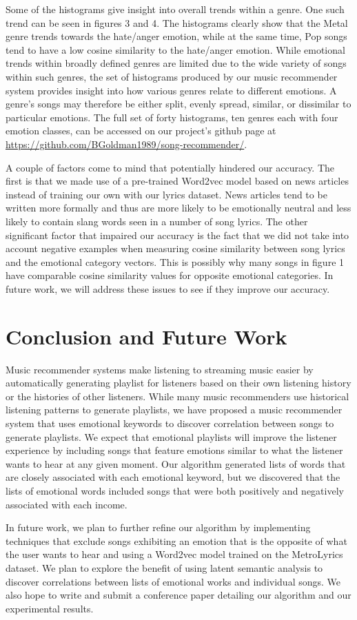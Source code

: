 \documentclass[10pt,twocolumn]{article}
\begin{document}
Some of the histograms give insight into overall trends within a genre. One such trend can be seen in figures 3 and 4. The histograms clearly show that the Metal genre trends towards the hate/anger emotion, while at the same time, Pop songs tend to have a low cosine similarity to the hate/anger emotion. While emotional trends within broadly defined genres are limited due to the wide variety of songs within such genres, the set of histograms produced by our music recommender system provides insight into how various genres relate to different emotions.  A genre's songs may therefore be either split, evenly spread, similar, or dissimilar to particular emotions. The full set of forty histograms, ten genres each with four emotion classes, can be accessed on our project's github page at \url{https://github.com/BGoldman1989/song-recommender/}.

A couple of factors come to mind that potentially hindered our accuracy.  The first is that we made use of a pre-trained Word2vec model based on news articles instead of training our own with our lyrics dataset.  News articles tend to be written more formally and thus are more likely to be emotionally neutral and less likely to contain slang words seen in a number of song lyrics.  The other significant factor that impaired our accuracy is the fact that we did not take into account negative examples when measuring cosine similarity between song lyrics and the emotional category vectors.  This is possibly why many songs in figure 1 have comparable cosine similarity values for opposite emotional categories.  In future work, we will address these issues to see if they improve our accuracy.

\section{Conclusion and Future Work}
Music recommender systems make listening to streaming music easier by automatically generating playlist for listeners based on their own listening history or the histories of other listeners.  While many music recommenders use historical listening patterns to generate playlists, we have proposed a music recommender system that uses emotional keywords to discover correlation between songs to generate playlists.  We expect that emotional playlists will improve the listener experience by including songs that feature emotions similar to what the listener wants to hear at any given moment.  Our algorithm generated lists of words that are closely associated with each emotional keyword, but we discovered that the lists of emotional words included songs that were both positively and negatively associated with each income.

In future work, we plan to further refine our algorithm by implementing techniques that exclude songs exhibiting an emotion that is the opposite of what the user wants to hear and using a Word2vec model trained on the MetroLyrics dataset.  We plan to explore the benefit of using latent semantic analysis to discover correlations between lists of emotional works and individual songs.  We also hope to write and submit a conference paper detailing our algorithm and our experimental results.




\end{document}
